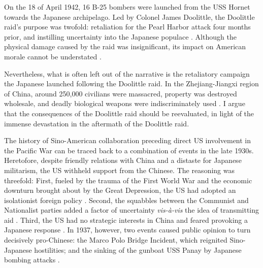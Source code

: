 \documentclass[12pt, a4paper, twoside]{article}
\begin{document}
\maketitle{}

On the 18 of April 1942, 16 B-25 bombers were launched from the USS Hornet towards the Japanese archipelago. Led by Colonel James Doolittle, the Doolittle raid's purpose was twofold: retaliation for the Pearl Harbor attack four months prior, and instilling uncertainty into the Japanese populace \autocite[p.\ 10]{DoolittleGlines1995ICouldNeverBeSoLuckyAgain}. Although the physical damage caused by the raid was insignificant, its impact on American morale cannot be understated \autocite[chap.\ 18]{Scott2015TargetTokyo}.

Nevertheless, what is often left out of the narrative is the retaliatory campaign the Japanese launched following the Doolittle raid. In the Zhejiang-Jiangxi region of China, around 250,000 civilians were massacred, property was destroyed wholesale, and deadly biological weapons were indiscriminately used \autocite[p.\ 385]{PacificWarMuseum2024ChinaIncidentWarMedal}. I argue that the consequences of the Doolittle raid should be reevaluated, in light of the immense devastation in the aftermath of the Doolittle raid.

The history of Sino-American collaboration preceding direct US involvement in the Pacific War can be traced back to a combination of events in the late 1930s. Heretofore, despite friendly relations with China and a distaste for Japanese militarism, the US withheld support from the Chinese. The reasoning was threefold: First, fueled by the trauma of the First World War and the economic downturn brought about by the Great Depression, the US had adopted an isolationist foreign policy \autocite{StateHistorian2013AmericanIsolationism}. Second, the squabbles between the Communist and Nationalist parties added a factor of uncertainty \emph{vis-à-vis} the idea of transmitting aid \autocite{Doolittle1942GeneralReportJapaneseRaid}. Third, the US had no strategic interests in China and feared provoking a Japanese response \autocite[p.\ 69--70]{CannonEtAl2009IB20thCenturyWorldHistory}. In 1937, however, two events caused public opinion to turn decisively pro-Chinese: the Marco Polo Bridge Incident, which reignited Sino-Japanese hostilities; and the sinking of the gunboat USS Panay by Japanese bombing attacks \autocite[pp.\ 47--54]{WrightNelson1939AmericanAttitudes}. 
\end{document}
